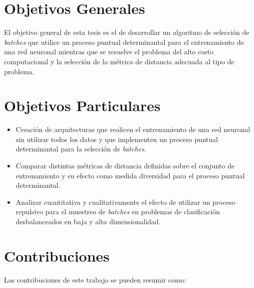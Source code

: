 \section{Objetivos Generales}

El objetivo general de esta tesis es el de desarrollar un algoritmo de selección de \textit{batches} que utilice un proceso puntual determinantal para el entrenamiento de una red neuronal mientras que se resuelve el problema del alto costo computacional y la selección de la métrica de distancia adecuada al tipo de problema.


\section{Objetivos Particulares}

\begin{itemize}
    \item Creación de arquitecturas que realicen el entrenamiento de una red neuronal sin utilizar todos los datos y que implementen un proceso puntual determinantal para la selección de \textit{batches}.
    
    \item Comparar distintas métricas de distancia definidas sobre el conjunto de entrenamiento y su efecto como medida diversidad para el proceso puntual determinantal. 

    \item Analizar cuantitativa y cualitativamente el efecto de utilizar un proceso repulsivo para el muestreo de \textit{batches} en problemas de clasificación desbalanceados en baja y alta dimensionalidad. 
    

\end{itemize}



\section{Contribuciones}

Las contribuciones de este trabajo se pueden resumir como: 

